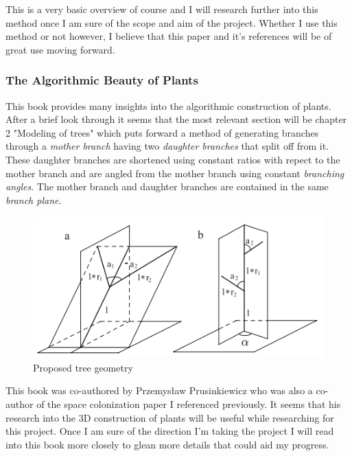 \documentclass[proposal]{cmpreport}
\begin{document}
This is a very basic overview of course and I will research further into this method 
once I am sure of the scope and aim of the project. Whether I use this method or not 
however, I believe that this paper and it's references will be of great use moving 
forward.

\subsubsection{The Algorithmic Beauty of Plants}
This book \cite{beautyOfPlants} provides many insights into the algorithmic construction 
of plants. After a brief look through it seems that the most relevant section will be 
chapter 2 "Modeling of trees" which puts forward a method of generating branches through 
a \textit{mother branch} having two \textit{daughter branches} that split off from it. 
These daughter branches are shortened using constant ratios with repect to the mother 
branch and are angled from the mother branch using constant \textit{branching angles}. 
The mother branch and daughter branches are contained in the same \textit{branch plane}.

\begin{figure}[h]
        \caption{Proposed tree geometry}
        \includegraphics{MDbranches}
        \centering
\end{figure}

This book was co-authored by Przemysław Prusinkiewicz who was also a co-author of the 
space colonization paper I referenced previously. It seems that his research into 
the 3D construction of plants will be useful while researching for this project. 
Once I am sure of the direction I'm taking the project I will read into this book more 
closely to glean more details that could aid my progress.

\pagebreak
\end{document}
